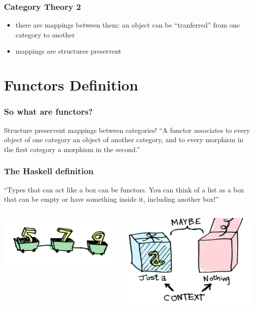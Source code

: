 \documentclass[12pt, xcolor=table]{beamer}
\begin{document}
\begin{frame}
    \frametitle{Category Theory 2}
    \begin{itemize}
        \item there are mappings between them: an object can be ``tranferred'' from one category to another
        \item  mappings are structures preservent%
    \end{itemize}
\end{frame}

\section{Functors Definition}
\begin{frame}
    \frametitle{So what are functors?}
    Structure preservent mappings between categories!
    \newline
    \newline
    ``A functor associates to every object of one category an object of another category, and to every morphism in the first category a morphism in the second.''
\end{frame}

\begin{frame}
    \frametitle{The Haskell definition}
    ``Types that can act like a box can be functors. You can think of a list as a box that can be empty or have something inside it, including another box!''
    \vspace{30px}
    \begin{columns}
            \begin{center}
            \includegraphics[scale=0.4]{figures/list.png}
            \end{center}
            \begin{center}
            \includegraphics[scale=0.4]{figures/maybe.png}
            \end{center}
    \end{columns}
\end{frame}
\end{document}
